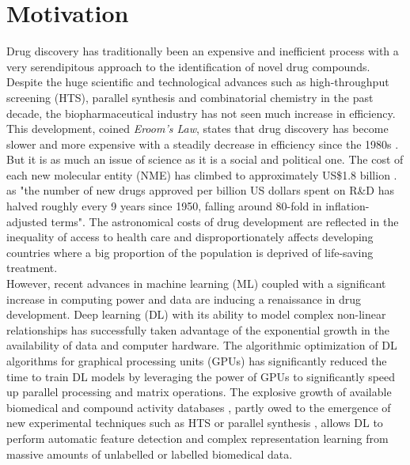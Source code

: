 \documentclass[bsc,frontabs,twoside,singlespacing,parskip,deptreport]{infthesis}     %
\let\Oldsection\section
\renewcommand{\section}{\FloatBarrier\Oldsection}
\begin{document}
\section{Motivation}
Drug discovery has traditionally been an expensive and inefficient process with a very serendipitous approach to the identification of novel drug compounds.
Despite the huge scientific and technological advances such as high-throughput screening (HTS), parallel synthesis and combinatorial chemistry in the past decade, the biopharmaceutical industry has not seen much increase in efficiency. This development, coined \textit{Eroom's Law}, states that drug discovery has become slower and more expensive with a steadily decrease in efficiency since the 1980s \cite{scannell_diagnosing_2012}. But it is as much an issue of science as it is a social and political one. The cost of each new molecular entity (NME) has climbed to approximately US\$1.8 billion \cite{paul_how_2010}. as "the number of new drugs approved per billion US dollars spent on R\&D has halved roughly every 9 years since 1950, falling around 80-fold in inflation-adjusted terms"\cite{scannell_diagnosing_2012}.
The astronomical costs of drug development are reflected in the inequality of access to health care and disproportionately affects developing countries where a big proportion of the population is deprived of life-saving treatment. \\
However, recent advances in machine learning (ML) coupled with a significant increase in computing power and data are inducing a renaissance in drug development.
Deep learning (DL) \cite{lecun_deep_2015} with its ability to model complex non-linear relationships has successfully taken advantage of the exponential growth in the availability of data and computer hardware. The algorithmic optimization of DL algorithms for graphical processing units (GPUs) has significantly reduced the time to train DL models by leveraging the power of GPUs to significantly speed up parallel processing and matrix operations.
The explosive growth of available biomedical and compound activity databases \cite{papadatos_activity_2015}\cite{kim_pubchem_2016}\cite{gaulton_chembl_2012}, partly owed to the emergence of new experimental techniques such as HTS or parallel synthesis \cite{grada_next-generation_2013}, allows DL to perform automatic feature detection and complex representation learning from massive amounts of unlabelled or labelled biomedical data.\\
\end{document}
